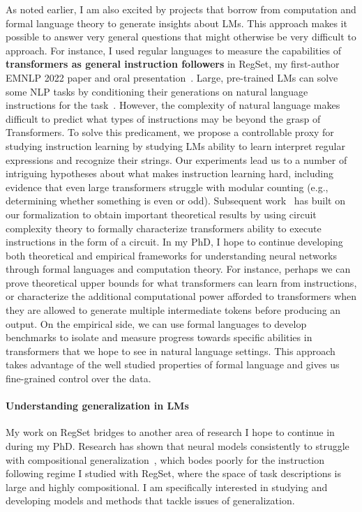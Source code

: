 \documentclass[12pt]{article}
\begin{document}
As noted earlier, I am also excited by projects 
that borrow from computation and formal language theory
to generate insights about LMs.
This approach makes it possible to answer very general 
questions that might otherwise be very difficult to approach.
For instance, I used regular languages
to measure the capabilities of 
\textbf{transformers as general instruction followers}
in RegSet, my first-author EMNLP 2022 paper 
and oral presentation~\cite{Finlayson2022WhatMI}. 
Large, pre-trained LMs can solve some NLP tasks 
by conditioning their generations on natural language instructions 
for the task~\cite{mishra2021crosstask, Wei2021FinetunedLM}. 
However, the complexity of natural language makes difficult to
predict what types of instructions may be beyond the grasp of Transformers.
To solve this predicament, 
we propose a controllable proxy for studying instruction learning
by studying LMs ability to learn interpret regular expressions
and recognize their strings.
Our experiments lead us to a number of intriguing hypotheses 
about what makes instruction learning hard, 
including evidence that even large transformers struggle with modular counting 
(e.g., determining whether something is even or odd). 
Subsequent work~\cite{Merrill2022LogPrecisionTA} 
has built on our formalization 
to obtain important theoretical results
by using circuit complexity theory
to formally characterize transformers ability to execute instructions in the form of a circuit.
In my PhD, I hope to continue developing both theoretical and empirical frameworks 
for understanding neural networks through formal languages and computation theory.
For instance, perhaps we can prove theoretical upper bounds 
for what transformers can learn from instructions,
or characterize the additional computational power 
afforded to transformers 
when they are allowed to generate multiple intermediate tokens 
before producing an output.
On the empirical side, we can use formal languages to develop benchmarks 
to isolate and measure progress towards specific abilities 
in transformers that we hope to see in natural language settings.
This approach takes advantage of the well studied properties of formal language
and gives us fine-grained control over the data.

\paragraph{Understanding generalization in LMs}
My work on RegSet bridges to another area of research I hope to continue in during my PhD.
Research has shown that neural models consistently to struggle with
compositional generalization~\cite{Lake2018GeneralizationWS}, 
which bodes poorly for the instruction following regime I studied with RegSet, 
where the space of task descriptions is large and highly compositional.
I am specifically interested in studying and developing models and methods
that tackle issues of generalization. 
\end{document}
